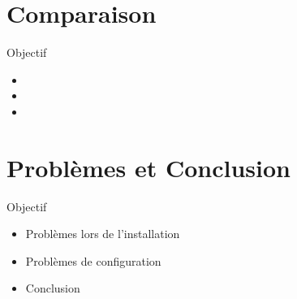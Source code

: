 \documentclass[t,12pt]{beamer}
\begin{document}
\section{Comparaison}                                                    %
\begin{frame}                                                         %
    \begin{center}{\textcolor{grisbleu}{\Large Objectif}}\end{center} %
    \begin{itemize}                                                   %
	\item
	\item
	\item
\end{itemize}
\end{frame}                                                            %


\section{Problèmes et Conclusion}                                                    %
\begin{frame}                                                         %
    \begin{center}{\textcolor{grisbleu}{\Large Objectif}}\end{center} %
    \begin{itemize}                                                   %
	\item Problèmes lors de l'installation
	\item Problèmes de configuration
	\item Conclusion
\end{itemize}
\end{frame}                                                            %
\end{document}
